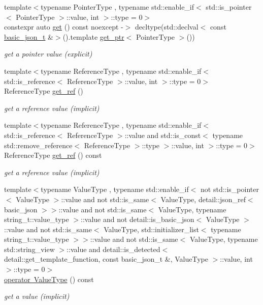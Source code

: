 \begin{DoxyCompactItemize}
{\footnotesize template$<$typename Pointer\+Type , typename std\+::enable\+\_\+if$<$ std\+::is\+\_\+pointer$<$ Pointer\+Type $>$\+::value, int $>$\+::type  = 0$>$ }\\constexpr auto \mbox{\hyperlink{classnlohmann_1_1basic__json_a5750dd9bd7bad23bc81d9173fda9a263}{get}} () const noexcept -\/$>$ decltype(std\+::declval$<$ const \mbox{\hyperlink{classnlohmann_1_1basic__json_afff7860310ae69f29f8158a77ec0ef13}{basic\+\_\+json\+\_\+t}} \&$>$().template \mbox{\hyperlink{classnlohmann_1_1basic__json_afb283ec92e108f9561a86427a609b87c}{get\+\_\+ptr}}$<$ Pointer\+Type $>$())
\begin{DoxyCompactList}\small\item\em get a pointer value (explicit) \end{DoxyCompactList}\item 
{\footnotesize template$<$typename Reference\+Type , typename std\+::enable\+\_\+if$<$ std\+::is\+\_\+reference$<$ Reference\+Type $>$\+::value, int $>$\+::type  = 0$>$ }\\Reference\+Type \mbox{\hyperlink{classnlohmann_1_1basic__json_afbd800010b67619463c0fce6e74f7878}{get\+\_\+ref}} ()
\begin{DoxyCompactList}\small\item\em get a reference value (implicit) \end{DoxyCompactList}\item 
{\footnotesize template$<$typename Reference\+Type , typename std\+::enable\+\_\+if$<$ std\+::is\+\_\+reference$<$ Reference\+Type $>$\+::value and std\+::is\+\_\+const$<$ typename std\+::remove\+\_\+reference$<$ Reference\+Type $>$\+::type $>$\+::value, int $>$\+::type  = 0$>$ }\\Reference\+Type \mbox{\hyperlink{classnlohmann_1_1basic__json_ac382f3d2bc6a5d52d936e4e40593f03b}{get\+\_\+ref}} () const
\begin{DoxyCompactList}\small\item\em get a reference value (implicit) \end{DoxyCompactList}\item 
{\footnotesize template$<$typename Value\+Type , typename std\+::enable\+\_\+if$<$ not std\+::is\+\_\+pointer$<$ Value\+Type $>$\+::value and not std\+::is\+\_\+same$<$ Value\+Type, detail\+::json\+\_\+ref$<$ basic\+\_\+json $>$$>$\+::value and not std\+::is\+\_\+same$<$ Value\+Type, typename string\+\_\+t\+::value\+\_\+type $>$\+::value and not detail\+::is\+\_\+basic\+\_\+json$<$ Value\+Type $>$\+::value and not std\+::is\+\_\+same$<$ Value\+Type, std\+::initializer\+\_\+list$<$ typename string\+\_\+t\+::value\+\_\+type $>$$>$\+::value and not std\+::is\+\_\+same$<$ Value\+Type, typename std\+::string\+\_\+view $>$\+::value and detail\+::is\+\_\+detected$<$ detail\+::get\+\_\+template\+\_\+function, const basic\+\_\+json\+\_\+t \&, Value\+Type $>$\+::value, int $>$\+::type  = 0$>$ }\\\mbox{\hyperlink{classnlohmann_1_1basic__json_a1f1d4bc973c5b866db3d96e14d2c9f3f}{operator Value\+Type}} () const
\begin{DoxyCompactList}\small\item\em get a value (implicit) \end{DoxyCompactList}\end{DoxyCompactItemize}
